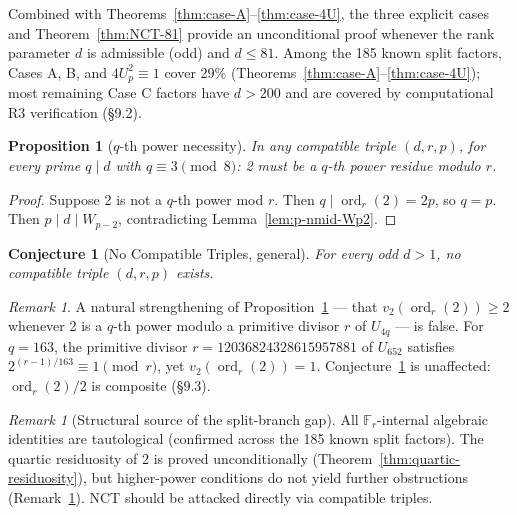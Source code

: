 \documentclass[12pt]{article}
\theoremstyle{plain}
\newtheorem{proposition}[theorem]{Proposition}
\newtheorem{conjecture}[theorem]{Conjecture}
\theoremstyle{definition}
\theoremstyle{remark}
\newtheorem{remark}[theorem]{Remark}
\begin{document}
Combined with Theorems~\ref{thm:case-A}--\ref{thm:case-4U},
the three explicit cases and Theorem~\ref{thm:NCT-81} provide an
unconditional proof whenever the rank parameter \(d\) is admissible
(odd) and \(d \leq 81\). Among the 185 known split factors,
Cases A, B, and \(4U_p^2 \equiv 1\) cover 29\%
(Theorems~\ref{thm:case-A}--\ref{thm:case-4U}); most remaining
Case C factors have \(d > 200\) and are covered by
computational R3 verification (\S9.2).

\begin{proposition}[{$q$-th power necessity}]\label{prop:qth-power}
In any compatible
triple \((d, r, p)\), for every prime \(q \mid d\) with
\(q \equiv 3 \pmod{8}\): 2 must be a \(q\)-th power residue
modulo \(r\).
\end{proposition}


\begin{proof}
Suppose 2 is not a \(q\)-th power mod \(r\). Then
\(q \mid \operatorname{ord}_r(2) = 2p\), so \(q = p\). Then
\(p \mid d \mid W_{p-2}\), contradicting Lemma~\ref{lem:p-nmid-Wp2}.\end{proof}


\begin{conjecture}[No Compatible Triples, general]\label{conj:nct-full}
For every odd \(d > 1\), no compatible triple
\((d, r, p)\) exists.
\end{conjecture}


\begin{remark}\label{rem:qpro-false}
A natural strengthening of Proposition~\ref{prop:qth-power} --- that
\(v_2(\operatorname{ord}_r(2)) \geq 2\) whenever 2 is a \(q\)-th
power modulo a primitive divisor \(r\) of \(U_{4q}\) --- is false.
For \(q = 163\), the primitive divisor
\(r = 12036824328615957881\) of \(U_{652}\) satisfies
\(2^{(r-1)/163} \equiv 1 \pmod{r}\), yet
\(v_2(\operatorname{ord}_r(2)) = 1\).
Conjecture~\ref{conj:nct-full} is unaffected: \(\operatorname{ord}_r(2)/2\) is
composite (\S9.3).
\end{remark}

\begin{remark}[Structural source of the split-branch gap]\label{rem:split-gap}
All \(\mathbb{F}_r\)-internal algebraic identities are tautological
(confirmed across the 185 known split factors). The quartic
residuosity of 2 is proved unconditionally (Theorem~\ref{thm:quartic-residuosity}), but
higher-power conditions do not yield further obstructions
(Remark~\ref{rem:qpro-false}). NCT should be attacked directly via compatible
triples.
\end{remark}
\end{document}
